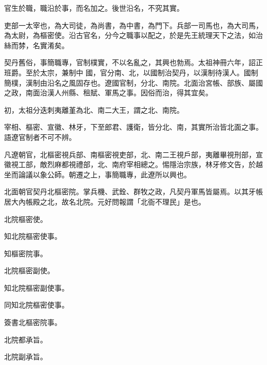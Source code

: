 
\begin{pinyinscope}

 官生於職，職沿於事，而名加之。後世沿名，不究其實。



 吏部一太宰也，為大司徒，為尚書，為中書，為門下。兵部一司馬也，為大司馬，為太尉，為樞密使。沿古官名，分今之職事以配之，於是先王統理天下之法，如治絲而棼，名實淆矣。



 契丹舊俗，事簡職專，官制樸實，不以名亂之，其興也勃焉。太祖神冊六年，詔正班爵。至於太宗，兼制中
 國，官分南、北，以國制治契丹，以漢制待漢人。國制簡樸，漢制由沿名之風固存也。遼國官制，分北、南院。北面治宮帳、部族、屬國之政，南面治漢人州縣、租賦、軍馬之事。因俗而治，得其宜矣。



 初，太祖分迭刺夷離堇為北、南二大王，謂之北、南院。



 宰相、樞密、宣徽、林牙，下至郎君、護衛，皆分北、南，其實所治皆北面之事。語遼官制者不可不辨。



 凡遼朝官，北樞密視兵部、南樞密視吏部，北、南二王視戶部，夷離畢視刑部，宣徽視工部，敵烈麻都視禮部，北、南府宰相總之。惕隱治宗族，林牙修文告，於越坐而論議以象公師。朝遷之上，事簡職專，此遼所以興也。



 北面朝官契丹北樞密院。掌兵機、武銓、群牧之政，凡契丹軍馬皆屬焉。以其牙帳居大內帳殿之北，故名北院。元好問報謂「北衙不理民」是也。



 北院樞密使。



 知北院樞密使事。



 知樞密院事。



 北院樞密副使。



 知北院樞密副使事。



 同知北院樞密使事。



 簽書北樞密院事。



 北院都承旨。



 北院副承旨。




\end{pinyinscope}
